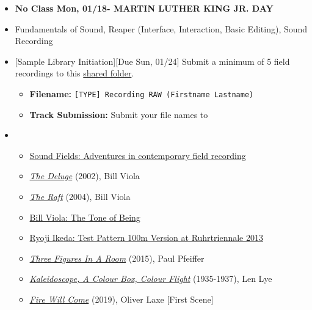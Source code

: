 \def\dMon{Mon, 01/18}
\def\dTues{Tues, 01/19}
\def\dWed{Wed, 01/20}
\def\dThur{Thur, 01/21}
\def\dFri{Fri, 01/22}
\def\dSat{Sat, 01/23}
\def\dSun{Sun, 01/24}
\placeDate

\begin{itemize}[noitemsep,topsep=0pt,leftmargin=*]
	\item \textcolor{defaultColor}{\textbf{No Class \dMon - MARTIN LUTHER KING JR. DAY}}

	\item {} Fundamentals of Sound, Reaper (Interface, Interaction, Basic Editing), Sound Recording
	\item {}[Sample Library Initiation][Due \dSun] \newline
	      Submit a minimum of 5 field recordings to this \href{\samplelibInitURL}{shared folder}.
	      \begin{itemize}
		      \item \textbf{Filename:} \texttt{[TYPE] Recording RAW (Firstname Lastname)}
		      \item \textbf{Track Submission:} Submit your file names to \discordE
	      \end{itemize}
	\item {}
	      \begin{itemize}
		      \item \href{https://www.youtube.com/watch?v=esfUwg1-xrI}{Sound Fields: Adventures in contemporary field recording}
		      \item \href{https://www.youtube.com/watch?v=t3VoMuwBPAE}{\emph{The Deluge}} (2002), Bill Viola
		      \item \href{https://www.youtube.com/watch?v=4Ili9pvlxdk}{\emph{The Raft}} (2004), Bill Viola
		      \item \href{https://vimeo.com/64302190}{Bill Viola: The Tone of Being}
		      \item \href{https://www.youtube.com/watch?v=XwjlYpJCBgk}{Ryoji Ikeda: Test Pattern 100m Version at Ruhrtriennale 2013}
		      \item \href{https://paul-pfeiffer.com/three-figures-in-a-room}{\emph{Three Figures In A Room}} (2015), Paul Pfeiffer
		      \item \href{https://www.youtube.com/watch?v=-DksmbDMDUU}{\emph{Kaleidoscope, A Colour Box, Colour Flight}} (1935-1937), Len Lye
		      \item \href{https://drive.google.com/drive/folders/1gVKTy4g6NgiLHdrMbCHSF4zTydVyF7jy}{\emph{Fire Will Come}} (2019), Oliver Laxe [First Scene]

\end{itemize}
\end{itemize}
